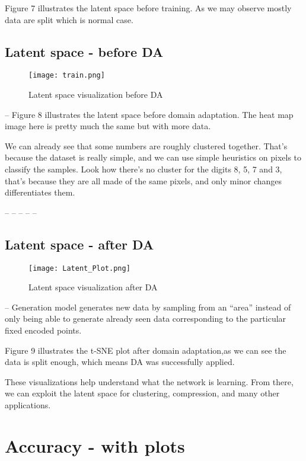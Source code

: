 \documentclass{article}
\begin{document}
Figure 7 illustrates the latent space before training. As we may observe mostly data are split which is normal case.
\clearpage

\subsection{Latent space - before DA}
\begin{wrapfigure}{l}{0.4\textwidth}
\texttt{[image: train.png]} 
\caption{Latent space visualization before DA}
\label{fig:wrapfig}
\end{wrapfigure}
--\newline
Figure 8 illustrates the latent space before domain adaptation. The heat map image here is pretty much the same but with more data.

We can already see that some numbers are roughly clustered together. That’s because the dataset is really simple, and we can use simple heuristics on pixels to classify the samples. Look how there’s no cluster for the digits 8, 5, 7 and 3, that’s because they are all made of the same pixels, and only minor changes differentiates them.


--\newline
--\newline
--\newline
--\newline
--\newline
\subsection{Latent space - after DA}
\begin{wrapfigure}{l}{0.4\textwidth}
\texttt{[image: Latent\_Plot.png]} 
\caption{Latent space visualization after DA}
\label{fig:wrapfig}
\end{wrapfigure}
--\newline
Generation model generates new data by sampling from an “area” instead of only being able to generate already seen data corresponding to the particular fixed encoded points. 

Figure 9 illustrates the t-SNE plot after domain adaptation,as we can see the data is split enough, which means DA was successfully applied.

These visualizations help understand what the network is learning. From there, we can exploit the latent space for clustering, compression, and many other applications.
\clearpage

\section{Accuracy - with plots}
\end{document}
